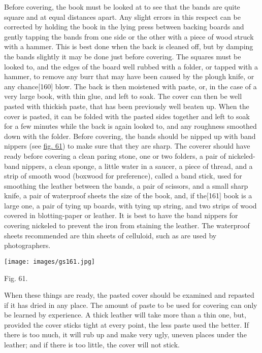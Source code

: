 \documentclass[
]{article}
\begin{document}
Before covering, the book must be looked at to see that the bands are
quite square and at equal distances apart. Any slight errors in this
respect can be corrected by holding the book in the lying press between
backing boards and gently tapping the bands from one side or the other
with a piece of wood struck with a hammer. This is best done when the
back is cleaned off, but by damping the bands slightly it may be done
just before covering. The squares must be looked to, and the edges of
the board well rubbed with a folder, or tapped with a hammer, to remove
any burr that may have been caused by the plough knife, or any
chance{\protect\hypertarget{Page_160}{}{{[}160{]}}} blow. The back is
then moistened with paste, or, in the case of a very large book, with
thin glue, and left to soak. The cover can then be well pasted with
thickish paste, that has been previously well beaten up. When the cover
is pasted, it can be folded with the pasted sides together and left to
soak for a few minutes while the back is again looked to, and any
roughness smoothed down with the folder. Before covering, the bands
should be nipped up with band nippers (see
\protect\hyperlink{Fig_61}{fig. 61}) to make sure that they are sharp.
The coverer should have ready before covering a clean paring stone, one
or two folders, a pair of nickeled-band nippers, a clean sponge, a
little water in a saucer, a piece of thread, and a strip of smooth wood
(boxwood for preference), called a band stick, used for smoothing the
leather between the bands, a pair of scissors, and a small sharp knife,
a pair of waterproof sheets the size of the book, and, if
the{\protect\hypertarget{Page_161}{}{{[}161{]}}} book is a large one, a
pair of tying up boards, with tying up string, and two strips of wood
covered in blotting-paper or leather. It is best to have the band
nippers for covering nickeled to prevent the iron from staining the
leather. The waterproof sheets recommended are thin sheets of celluloid,
such as are used by photographers.

\protect\hypertarget{Fig_61}{}{}
\texttt{[image: images/gs161.jpg]}

Fig. 61.

When these things are ready, the pasted cover should be examined and
repasted if it has dried in any place. The amount of paste to be used
for covering can only be learned by experience. A thick leather will
take more than a thin one, but, provided the cover sticks tight at every
point, the less paste used the better. If there is too much, it will rub
up and make very ugly, uneven places under the leather; and if there is
too little, the cover will not stick.
\end{document}
